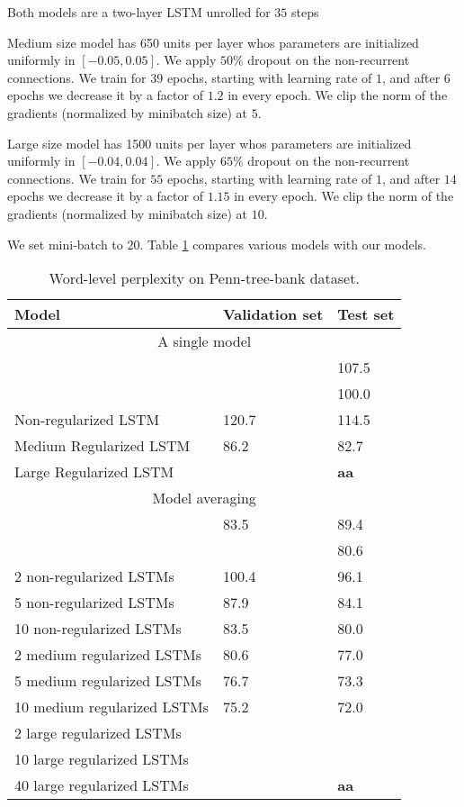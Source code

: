 \documentclass{article}
\begin{document}
Both models are a two-layer LSTM unrolled for $35$ steps


Medium size model has 650 units per layer
whos parameters are initialized uniformly in $[-0.05,
  0.05]$. We apply $50\%$ dropout on the non-recurrent connections. We
train for $39$ epochs, starting with learning rate of $1$, and after
$6$ epochs we decrease it by a factor of $1.2$ in every epoch. We
clip the norm of the gradients
(normalized by minibatch size) at $5$. 


Large size model has 1500 units per layer
whos parameters are initialized uniformly in $[-0.04,
  0.04]$. We apply $65\%$ dropout on the non-recurrent connections. We
train for $55$ epochs, starting with learning rate of $1$, and after
$14$ epochs we decrease it by a factor of $1.15$ in every epoch. We
clip the norm of the gradients
(normalized by minibatch size) at $10$. 


We set mini-batch to
$20$. Table \ref{tab:ptb} compares various models with our models.

\begin{table}[t]
  \small
  \centering
  \renewcommand{\arraystretch}{1.15}
  \begin{tabular}{lll}
    \hline
     Model & Validation set & Test set \\
    \hline
    \multicolumn{3}{c}{A single model} \\
    \hline
    \cite{pascanu2013construct} & & 107.5 \\
    \cite{chenglanguage} & & 100.0 \\
    Non-regularized LSTM & 120.7 & 114.5 \\
    Medium Regularized LSTM & 86.2 & 82.7 \\
    Large Regularized LSTM & & {\bf aa} \\
    \hline
    \multicolumn{3}{c}{Model averaging} \\
    \hline
    \cite{mikolov2012statistical} & 83.5 & 89.4 \\
    \cite{chenglanguage} & & 80.6 \\
    2 non-regularized LSTMs & 100.4 & 96.1 \\
    5 non-regularized LSTMs & 87.9 & 84.1 \\
    10 non-regularized LSTMs & 83.5 & 80.0 \\
    2 medium regularized LSTMs & 80.6 & 77.0 \\
    5 medium regularized LSTMs & 76.7 & 73.3 \\
    10 medium regularized LSTMs & 75.2 & 72.0 \\
    2 large regularized LSTMs & & \\
    10 large regularized LSTMs & & \\
    40 large regularized LSTMs & & {\bf aa} \\
    \hline
  \end{tabular}
  \caption{Word-level perplexity on Penn-tree-bank dataset.}
  \label{tab:ptb}
\end{table}
\end{document}
